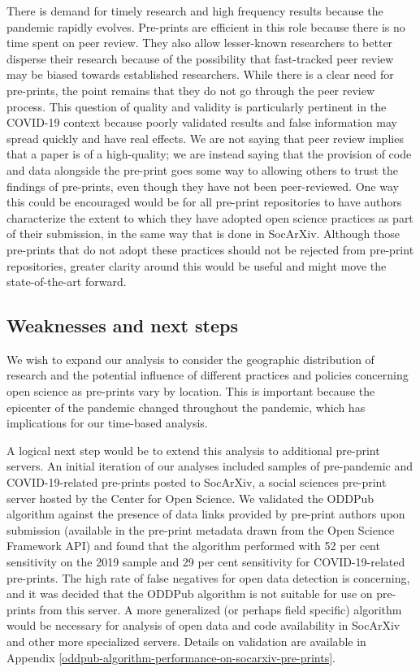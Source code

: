 \documentclass[
]{article}
\begin{document}
There is demand for timely research and high frequency results because the pandemic rapidly evolves. Pre-prints are efficient in this role because there is no time spent on peer review. They also allow lesser-known researchers to better disperse their research because of the possibility that fast-tracked peer review may be biased towards established researchers. While there is a clear need for pre-prints, the point remains that they do not go through the peer review process. This question of quality and validity is particularly pertinent in the COVID-19 context because poorly validated results and false information may spread quickly and have real effects. We are not saying that peer review implies that a paper is of a high-quality; we are instead saying that the provision of code and data alongside the pre-print goes some way to allowing others to trust the findings of pre-prints, even though they have not been peer-reviewed. One way this could be encouraged would be for all pre-print repositories to have authors characterize the extent to which they have adopted open science practices as part of their submission, in the same way that is done in SocArXiv. Although those pre-prints that do not adopt these practices should not be rejected from pre-print repositories, greater clarity around this would be useful and might move the state-of-the-art forward.

\hypertarget{weaknesses-and-next-steps}{%
\subsection{Weaknesses and next steps}\label{weaknesses-and-next-steps}}

We wish to expand our analysis to consider the geographic distribution of research and the potential influence of different practices and policies concerning open science as pre-prints vary by location. This is important because the epicenter of the pandemic changed throughout the pandemic, which has implications for our time-based analysis.

A logical next step would be to extend this analysis to additional pre-print servers. An initial iteration of our analyses included samples of pre-pandemic and COVID-19-related pre-prints posted to SocArXiv, a social sciences pre-print server hosted by the Center for Open Science. We validated the ODDPub algorithm against the presence of data links provided by pre-print authors upon submission (available in the pre-print metadata drawn from the Open Science Framework API) and found that the algorithm performed with 52 per cent sensitivity on the 2019 sample and 29 per cent sensitivity for COVID-19-related pre-prints. The high rate of false negatives for open data detection is concerning, and it was decided that the ODDPub algorithm is not suitable for use on pre-prints from this server. A more generalized (or perhaps field specific) algorithm would be necessary for analysis of open data and code availability in SocArXiv and other more specialized servers. Details on validation are available in Appendix \ref{oddpub-algorithm-performance-on-socarxiv-pre-prints}.
\end{document}
